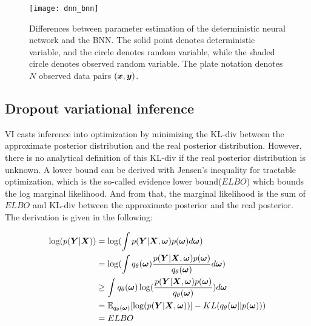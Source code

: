 \begin{figure}[H]
	\begin{center}
		\texttt{[image: dnn\_bnn]}
		\caption{Differences between parameter estimation of the deterministic neural network and the \gls{BNN}. The solid point denotes deterministic variable, and the circle denotes random variable, while the shaded circle denotes observed random variable. The plate notation denotes $N$ observed data pairs $(\boldsymbol x, \boldsymbol y)$.}%
		\label{fig:dnn_bnn}
	\end{center}
\end{figure}

\subsection{Dropout variational inference}
\gls{VI} casts inference into optimization by minimizing the \gls{KL-div} between the approximate posterior distribution and the real posterior distribution. However, there is no analytical definition of this \gls{KL-div} if the real posterior distribution is unknown. A lower bound can be derived with Jensen's inequality for tractable optimization, which is the so-called evidence lower bound($ELBO$) which bounds the log marginal likelihood. And from that, the marginal likelihood is the sum of $ELBO$ and \gls{KL-div} between the approximate posterior and the real posterior. The derivation is given in the following:

\begin{equation}\label{2.6}	
\begin{aligned}
\log(p(\boldsymbol{Y}|\boldsymbol{X})) & = \log(\int p(\boldsymbol{Y}| \boldsymbol{X}, \boldsymbol{\omega})  p(\boldsymbol{\omega})d\boldsymbol{\omega}) \\	 
& = \log(\int{q_{\theta}(\boldsymbol{\omega}) \frac{p(\boldsymbol{Y}| \boldsymbol{X}, \boldsymbol{\omega}) p(\boldsymbol{\omega})}{q_{\theta}(\boldsymbol{\omega})}d\boldsymbol{\omega}}) \\
& \geq \int q_{\theta}(\boldsymbol{\omega}) \log( \frac{p(\boldsymbol{Y}| \boldsymbol{X}, \boldsymbol{\omega}) p(\boldsymbol{\omega})}{q_{\theta}(\boldsymbol{\omega})}) d\boldsymbol{\omega} \\
& = \mathbb E_{q_{\theta}(\boldsymbol{\omega})}[\log(p(\boldsymbol{Y}| \boldsymbol{X}, \boldsymbol{\omega}))] -  KL(q_{\theta}(\boldsymbol{\omega}||p(\boldsymbol{\omega})))\\
& = ELBO
\end{aligned}
\end{equation}

